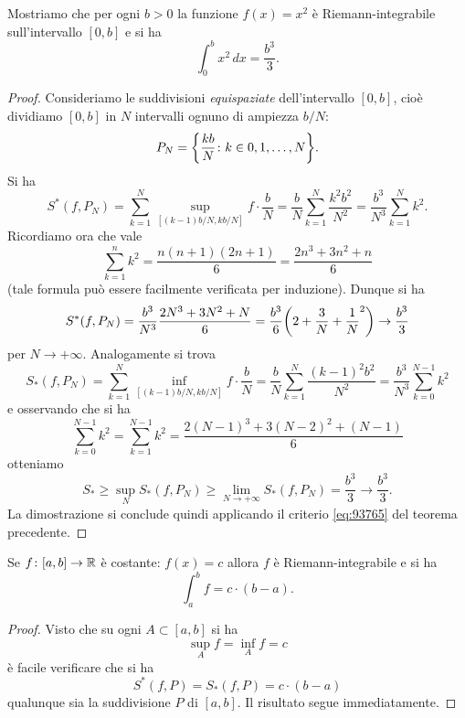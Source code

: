 \begin{example}
\label{ex:integrale_quadrato}
Mostriamo che per ogni $b>0$ la funzione $f(x)=x^2$ è Riemann-integrabile sull'intervallo $[0,b]$ e si ha
\[
 \int_0^b x^2\, dx = \frac{b^3}{3}.
\]
\end{example}
\begin{proof}
Consideriamo le suddivisioni \emph{equispaziate} dell'intervallo $[0,b]$, cioè dividiamo $[0,b]$ in $N$ intervalli ognuno di ampiezza $b/N$:
\[
P_N = {\left\{ \frac{kb}{N}\colon k \in 0, 1, \dots, N \right\}}.
\]
Si ha
\[
  S^*(f,P_N) = \sum_{k=1}^N \sup_{[(k-1)b/N,kb/N]}f \cdot \frac b N
   = \frac{b}{N} \sum_{k=1}^N \frac{k^2b^2}{N^2}
   = \frac{b^3}{N^3} \sum_{k=1}^N k^2.
\]
Ricordiamo ora che vale
\[
  \sum_{k=1}^n k^2 = \frac{n(n+1)(2n+1)}{6} = \frac{2n^3+3n^2+n}{6}
\]
(tale formula può essere facilmente verificata per induzione). Dunque si ha
\[
  S^*(f,P_N) = \frac{b^3}{N^3} \frac{2N^3+3N^2+N}{6}
       = \frac{b^3}{6}{\left( 2 + \frac{3}{N}+\frac 1 N^2 \right)}
       \to \frac{b^3}{3}
\]
per $N\to +\infty$.
Analogamente si trova
\[
  S_*(f,P_N) = \sum_{k=1}^N \inf_{[(k-1)b/N,kb/N]} f \cdot \frac{b}{N}
  = \frac{b}{N}\sum_{k=1}^N \frac{(k-1)^2b^2}{N^2}
  = \frac{b^3}{N^3} \sum_{k=0}^{N-1} k^2
\]
e osservando che si ha
\[
 \sum_{k=0}^{N-1} k^2 = \sum_{k=1}^{N-1} k^2 = \frac{2(N-1)^3+3(N-2)^2+(N-1)}{6}
\]
otteniamo
\[
 S_*\ge \sup_N S_*(f,P_N) \ge \lim_{N\to+\infty} S_*(f,P_N) = \frac{b^3}{3} \to \frac{b^3}{3}.
\]
La dimostrazione si conclude quindi applicando
il criterio \eqref{eq:93765} del teorema precedente.
\end{proof}

\begin{theorem}
\label{th:integrale_costante}
Se $f\colon[a,b]\to \mathbb R$ è costante: $f(x) = c$ allora
$f$ è Riemann-integrabile e si ha
\[
  \int_a^b f = c\cdot (b-a).
\]
\end{theorem}
%
\begin{proof}
Visto che su ogni $A\subset [a,b]$ si ha
\[
  \sup_A f = \inf_A f = c
\]
è facile verificare che si ha
\[
  S^*(f,P) = S_*(f,P) = c\cdot (b-a)
\]
qualunque sia la suddivisione $P$ di $[a,b]$. Il risultato segue immediatamente.
\end{proof}

